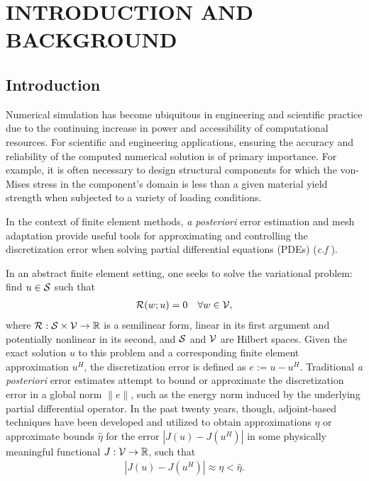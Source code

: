 \chapter{INTRODUCTION AND BACKGROUND}
\label{chap:intro}

\let\thefootnote\relax{}

\section{Introduction}

Numerical simulation has become ubiquitous in engineering and scientific
practice due to the continuing increase in power and accessibility of
computational resources. For scientific and engineering applications, ensuring
the accuracy and reliability of the computed numerical solution is of primary
importance. For example, it is often necessary to design structural components
for which the von-Mises stress in the component's domain is less than a given
material yield strength when subjected to a variety of loading conditions.

In the context of finite element methods, \emph{a posteriori} error estimation
and mesh adaptation provide useful tools for approximating and controlling
the discretization error when solving partial differential equations
(PDEs) (\emph{c.f} \cite{ainsworth2011posteriori, gratsch2005posteriori,
verfurth1994adaptive}).

In an abstract finite element setting, one seeks to solve the variational
problem: find $u \in \S$ such that
%
\begin{gather}
\R(w; u) = 0 \quad \forall w \in \V,
\end{gather}
%
where $\R: \S \times \V \to \mathbb{R}$ is a semilinear form, linear in its
first argument and potentially nonlinear in its second, and $\S$ and
$\V$ are Hilbert spaces. Given the exact solution $u$ to this problem and
a corresponding finite element approximation $u^H$, the discretization error
is defined as $e := u -u^H$. Traditional \emph{a posteriori} error estimates
attempt to bound or approximate the discretization error in a global norm
$\| e \|$, such as the energy norm induced by the underlying partial
differential operator. In the past twenty years, though, adjoint-based
techniques have been developed and utilized to obtain approximations $\eta$
or approximate bounds $\hat{\eta}$ for the error $|J(u) - J(u^H)|$ in some
physically meaningful functional $J : \V \to \mathbb{R}$, such that
%
\begin{gather}
|J(u) - J(u^H)| \approx \eta < \hat{\eta}.
\end{gather}

